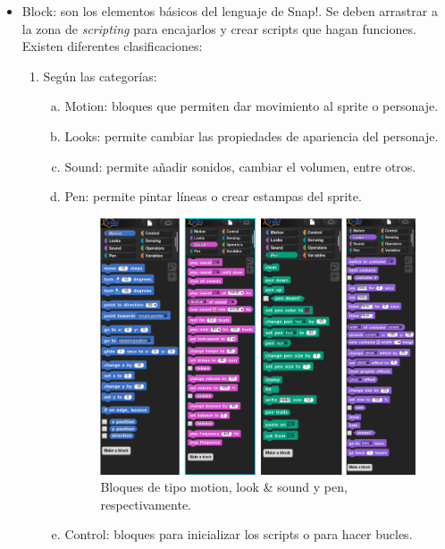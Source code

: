 \documentclass[a4paper, 12pt]{book}
\begin{document}
\begin{itemize}
     \item Block: son los elementos básicos del lenguaje de Snap!. Se deben arrastrar a la zona de \textit{scripting} para encajarlos y crear scripts que hagan funciones. Existen diferentes clasificaciones:
     
     \begin{enumerate}[1)]
        \item Según las categorías:
   
            \begin{enumerate}[a)]
                \item Motion: bloques que permiten dar movimiento al sprite o personaje.
                \item Looks: permite cambiar las propiedades de apariencia del personaje.
                \item Sound: permite añadir sonidos, cambiar el volumen, entre otros.
                \item Pen: permite pintar líneas o crear estampas del sprite.
                \\
                    \begin{figure}[h]
                        \centering
                        \includegraphics[scale=0.45]{img/4-blocks.png}
                        \caption{Bloques de tipo motion, look \&  sound y pen, respectivamente.}
                        \label{figura:bloque1}
                    \end{figure}
                \item Control: bloques para inicializar los scripts o para hacer bucles.

\end{enumerate}
\end{enumerate}
\end{itemize}
\end{document}

